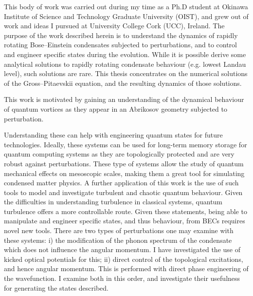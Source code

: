 
This body of work was carried out during my time as a Ph.D student at Okinawa Institute of Science and Technology Graduate University (OIST), and grew out of work and ideas I pursued at University College Cork (UCC), Ireland. The purpose of the work described herein is to understand the dynamics of rapidly rotating Bose--Einstein condensates subjected to perturbations, and to control and engineer specific states during the evolution. While it is possible derive some analytical solutions to rapidly rotating condensate behaviour (e.g. lowest Landau level), such solutions are rare. This thesis concentrates on the numerical solutions of the Gross--Pitaevskii equation, and the resulting dynamics of those solutions.


This work is motivated by gaining an understanding of the dynamical behaviour of quantum vortices as they appear in an Abrikosov geometry subjected to perturbation. %

 Understanding these can help with engineering quantum states for future technologies. Ideally, these systems can be used for long-term memory storage for quantum computing systems as they are topologically protected and are very robust against perturbations. These type of systems allow the study of quantum mechanical effects on mesoscopic scales, making them a great tool for simulating condensed matter physics. A further application of this work is the use of such tools to model and investigate turbulent and chaotic quantum behaviour. Given the difficulties in understanding turbulence in classical systems, quantum turbulence offers a more controllable route. Given these statements, being able to manipulate and engineer specific states, and thus behaviour, from BECs requires novel new tools. There are two types of perturbations one may examine with these systems: i) the modification of the phonon spectrum of the condensate which does not influence the angular momentum. I have investigated the use of kicked optical potentials for this; ii) direct control of the topological excitations, and hence angular momentum. This is performed with direct phase engineering of the wavefunction. I examine both in this order, and investigate their usefulness for generating the states described.

